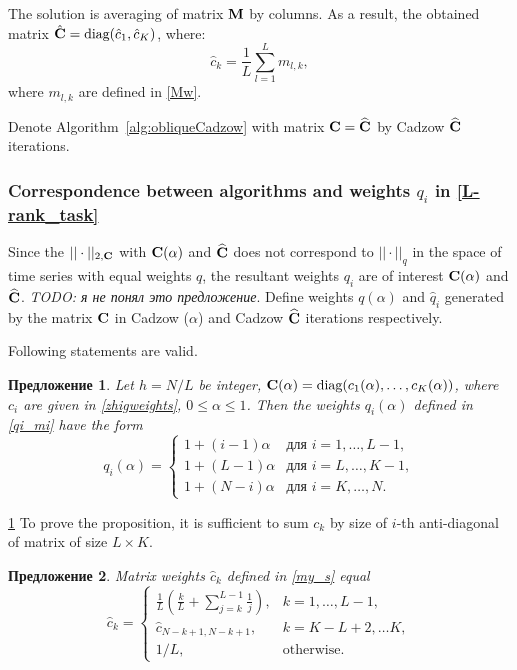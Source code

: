 \documentclass[12pt,a4paper,fleqn,leqno]{article}
\newtheorem{proposition}{Предложение}
\begin{document}
The solution is averaging of matrix $\mathbf{M}$ by columns. As a result, the obtained matrix $\hat {\mathbf{C}} = \text{diag}(\hat c_1, \hat c_K)$, where:
\begin{equation}\label{my_s}
\hat c_k = \frac{1}{L}\sum_{l=1}^L m_{l, k},
\end{equation}
where $m_{l, k}$ are defined in \ref{Mw}.

Denote Algorithm~\ref{alg:obliqueCadzow} with matrix $\mathbf{C}=\widehat{\mathbf{C}}$ by Cadzow $\widehat{\mathbf{C}}$ iterations.

\subsubsection{Correspondence between algorithms and weights $q_i$ in \eqref{L-rank_task}}
Since the $||\cdot||_{2, \mathbf{C}}$ with $\mathbf{C}(\alpha)$ and $\widehat {\mathbf{C}}$ does not correspond to $||\cdot||_q$ in the space of time series with equal weights $q$, the resultant weights $q_i$ are of interest $\mathbf{C}(\alpha)$ and $\widehat {\mathbf{C}}$. \emph{TODO: я не понял это предложение}.
Define weights $q(\alpha)$ and $\hat q_i$ generated by the matrix $\mathbf{C}$ in Cadzow ($\alpha$) and Cadzow $\widehat{\mathbf{C}}$ iterations respectively.

Following statements are valid.

\begin{proposition}\label{zhigconseq}
Let $h = N/L$ be integer, $\mathbf{C}(\alpha) = \text{diag}(c_1(\alpha), \ldots, c_K(\alpha))$, where $c_i$ are given in \eqref{zhigweights}, $0 \le \alpha \le 1$. Then the weights $q_i(\alpha)$ defined in \eqref{qi_mi} have the form
\begin{equation*}
q_i (\alpha) = \begin{cases}
1 + (i - 1) \alpha & \text{для $i = 1, \ldots, L-1,$}\\
1 + (L - 1) \alpha & \text{для $i = L, \ldots, K-1,$}\\
1 + (N - i) \alpha & \text{для $i = K, \ldots, N.$}
\end{cases}
\end{equation*}
\end{proposition}
\begin{proof5}{\ref{zhigconseq}}
To prove the proposition, it is sufficient to sum $c_k$ by size of $i$-th anti-diagonal of matrix of size $L \times K$.
\end{proof5}


\begin{proposition} \label{myweightstat}
Matrix weights $\hat c_k$ defined in \eqref{my_s} equal
\begin{equation*}
\hat c_k = \begin{cases}
\frac{1}{L}\left(\frac{k}{L} + \sum_{j=k}^{L-1} \frac{1}{j} \right),& k = 1, \ldots, L-1, \\
\hat c_{N - k + 1, N - k + 1}, & k = K - L + 2, \ldots K, \\
1/L, &\text{otherwise}.
\end{cases}
\end{equation*}
\end{proposition}
\end{document}
